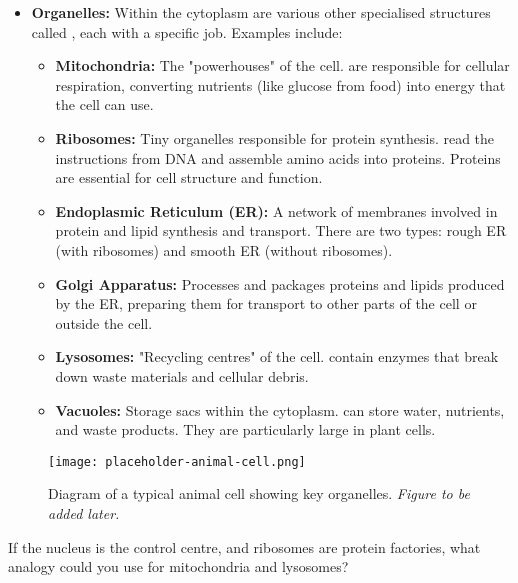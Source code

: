 \begin{itemize}
    \item \textbf{Organelles:}  Within the cytoplasm are various other specialised structures called , each with a specific job. Examples include:
    \begin{itemize}
        \item \textbf{Mitochondria:}  The "powerhouses" of the cell.   are responsible for cellular respiration, converting nutrients (like glucose from food) into energy that the cell can use. 
        \item \textbf{Ribosomes:}  Tiny organelles responsible for protein synthesis.  read the instructions from DNA and assemble amino acids into proteins.  Proteins are essential for cell structure and function.
        \item \textbf{Endoplasmic Reticulum (ER):}  A network of membranes involved in protein and lipid synthesis and transport. There are two types: rough ER (with ribosomes) and smooth ER (without ribosomes).
        \item \textbf{Golgi Apparatus:}  Processes and packages proteins and lipids produced by the ER, preparing them for transport to other parts of the cell or outside the cell.
        \item \textbf{Lysosomes:}  "Recycling centres" of the cell.  contain enzymes that break down waste materials and cellular debris.
        \item \textbf{Vacuoles:}  Storage sacs within the cytoplasm.  can store water, nutrients, and waste products. They are particularly large in plant cells.
    \end{itemize}
\end{itemize}

\begin{figure}[htb]
    \centering
    \texttt{[image: placeholder-animal-cell.png]}
    \caption{Diagram of a typical animal cell showing key organelles. \textit{Figure to be added later.}}
    \label{fig:animal-cell}
\end{figure}

\begin{stopandthink}
If the nucleus is the control centre, and ribosomes are protein factories, what analogy could you use for mitochondria and lysosomes?
\end{stopandthink}


